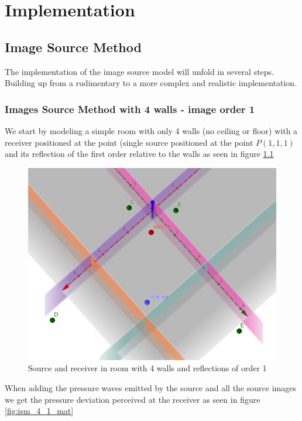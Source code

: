 \chapter{Implementation}
\label{chap:implementation}
\section{Image Source Method}
The implementation of the image source model will unfold in several steps. Building up from a rudimentary to a more complex and realistic implementation.
\subsection{Images Source Method with 4 walls - image order 1}
We start by modeling a simple room with only 4 walls (no ceiling or floor) with a receiver positioned at the point (single source positioned at the point $P(1,1,1)$ and its reflection of the first order relative to the walls as seen in figure \ref{fig:ism_4_1_geo}\\
\begin{figure}
    \centerline{\includegraphics[width=1.3\textwidth,keepaspectratio]{LaTeX/images/geometrie/ism_4_walls_order_1.png}}
    \caption{Source and receiver in room with 4 walls and reflections of order 1}
    \label{fig:ism_4_1_geo}
\end{figure}
When adding the pressure waves emitted by the source and all the source images we get the pressure deviation perceived at the receiver as seen in figure \ref{fig:ism_4_1_mat}
